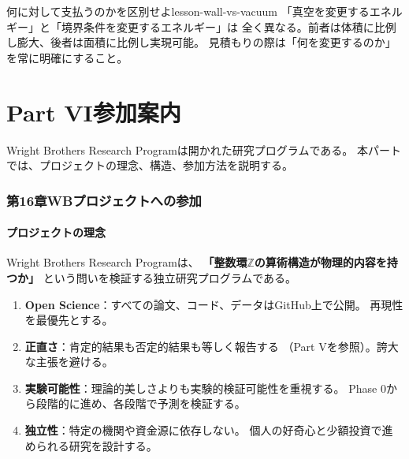 \documentclass[11pt,a4paper]{article}
\begin{document}
\begin{keylesson}{何に対して支払うのかを区別せよ}{lesson-wall-vs-vacuum}
「真空を変更するエネルギー」と「境界条件を変更するエネルギー」は
全く異なる。前者は体積に比例し膨大、後者は面積に比例し実現可能。
見積もりの際は「何を変更するのか」を常に明確にすること。
\end{keylesson}



\newpage
\part*{Part VI\quad 参加案内}

\vspace{1em}
\noindent
Wright Brothers Research Programは開かれた研究プログラムである。
本パートでは、プロジェクトの理念、構造、参加方法を説明する。



\section{第16章\quad WBプロジェクトへの参加}
\label{ch:joining-wb}

\subsection{プロジェクトの理念}
\label{sec:16.1}

Wright Brothers Research Programは、
\textbf{「整数環$\mathbb{Z}$の算術構造が物理的内容を持つか」}
という問いを検証する独立研究プログラムである。

\begin{tcolorbox}[colback=blue!5!white, colframe=blue!60!black, title=基本理念]
\begin{enumerate}[label=\arabic*.]
\item \textbf{Open Science}：すべての論文、コード、データはGitHub上で公開。
再現性を最優先とする。

\item \textbf{正直さ}：肯定的結果も否定的結果も等しく報告する
（Part Vを参照）。誇大な主張を避ける。

\item \textbf{実験可能性}：理論的美しさよりも実験的検証可能性を重視する。
Phase 0から段階的に進め、各段階で予測を検証する。

\item \textbf{独立性}：特定の機関や資金源に依存しない。
個人の好奇心と少額投資で進められる研究を設計する。
\end{enumerate}
\end{tcolorbox}
\end{document}
